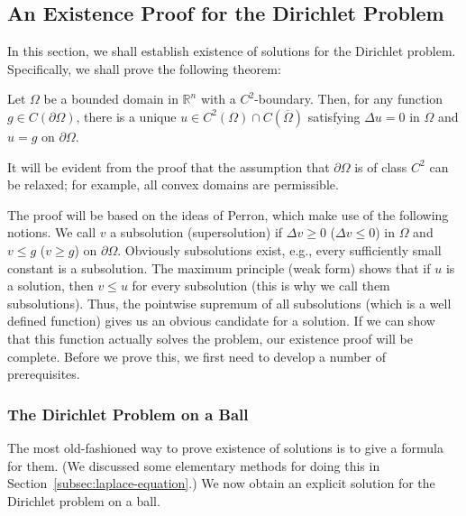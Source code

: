 \subsection{An Existence Proof for the Dirichlet Problem}\label{sec:dirichlet-existence-proof}

In this section, we shall establish existence of solutions for the Dirichlet problem. Specifically, we shall prove the following theorem:

\begin{Theorem}
\label{thm:dirichlet-continuous-data-existence}
Let $\Omega$ be a bounded domain in $\mathbb{R}^n$ with a $C^2$-boundary. Then, for any function $g\in C(\partial\Omega)$, there is a unique $u\in C^2(\Omega)\cap C(\overline\Omega)$ satisfying $\Delta u=0$ in $\Omega$ and $u=g$ on $\partial\Omega$.
\end{Theorem}

It will be evident from the proof that the assumption that $\partial\Omega$ is of class $C^2$ can be relaxed; for example, all convex domains are permissible.

The proof will be based on the ideas of Perron, which make use of the following notions. We call $v$ a subsolution (supersolution) if $\Delta v\geq0$ ($\Delta v\leq0$) in $\Omega$ and $v\leq g$ ($v\geq g$) on $\partial\Omega$. Obviously subsolutions exist, e.g., every sufficiently small constant is a subsolution. The maximum principle (weak form) shows that if $u$ is a solution, then $v\leq u$ for every subsolution (this is why we call them subsolutions). Thus, the pointwise supremum of all subsolutions (which is a well defined function) gives us an obvious candidate for a solution. If we can show that this function actually solves the problem, our existence proof will be complete. Before we prove this, we first need to develop a number of prerequisites.

\subsubsection{The Dirichlet Problem on a Ball}\label{subsec:dirichlet-problem-on-ball}

The most old-fashioned way to prove existence of solutions is to give a formula for them. (We discussed some elementary methods for doing this in Section~\ref{subsec:laplace-equation}.) We now obtain an explicit solution for the Dirichlet problem on a ball.

